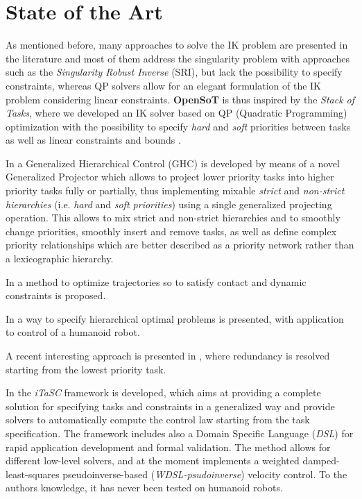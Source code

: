 \section{State of the Art}
\label{sec:state_of_the_art}
As mentioned before, many approaches to solve the IK problem are presented in the literature and most of them address  the singularity problem with approaches such as the \emph{Singularity Robust Inverse} (SRI), but lack the possibility to specify constraints, whereas QP solvers allow for an elegant formulation of the IK problem considering linear constraints.
\textbf{OpenSoT} is thus inspired by the \emph{Stack of Tasks}, where we developed an IK solver based on QP (Quadratic Programming) optimization with the possibility to specify \emph{hard} \cite{kanoun2009prioritizing} and \emph{soft} \cite{chiacchio1991closed} priorities between tasks as well as linear constraints and bounds \cite{escande2014hierarchical}.

In \cite{Liu2015-yq} a Generalized Hierarchical Control (GHC) is developed by means of a novel Generalized Projector which allows to project lower priority tasks into higher priority tasks fully or partially, thus implementing mixable \emph{strict} and \emph{non-strict hierarchies} (i.e. \emph{hard} and \emph{soft priorities}) using a single generalized projecting operation. This allows to mix strict and non-strict hierarchies and to smoothly change priorities, smoothly insert and remove tasks, as well as define complex priority relationships which are better described as a priority network rather than a lexicographic hierarchy.

In \cite{Hauser2014-sq} a method to optimize trajectories so to satisfy contact and dynamic constraints is proposed.

In \cite{Del_Prete2014-ph} a way to specify hierarchical optimal problems is presented, with application to control of a humanoid robot.

A recent interesting approach is presented in \cite{flacco14revprio}, where redundancy is resolved starting from the lowest priority task.

In \cite{De_Schutter2007-to,Decre2009-om,Decre2013-yt,Smits2009-nv,Vanthienen2012-ed,Vanthienen2013-pl} the \emph{iTaSC} framework is developed, which aims at providing a complete solution for specifying tasks and constraints in a generalized way and provide solvers to automatically compute the control law starting from the task specification. The framework includes also a Domain Specific Language (\emph{DSL}) for rapid application development and formal validation. The method allows for different low-level solvers, and at the moment implements a weighted damped-least-squares pseudoinverse-based (\emph{WDSL-psudoinverse}) velocity control. To the authors knowledge, it has never been tested on humanoid robots.

